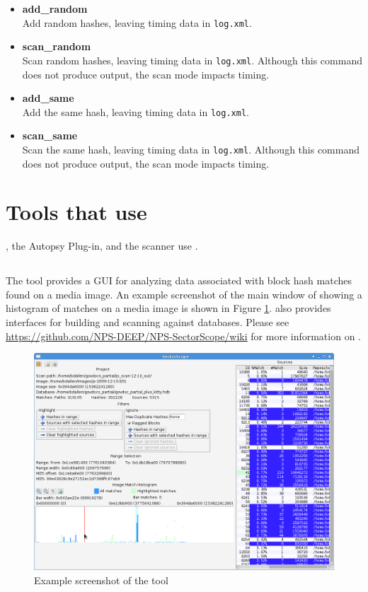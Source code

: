 \documentclass[11pt,fleqn]{article} %
\begin{document}
\begin{itemize}
\item \textbf{add\_random}\\
Add random hashes, leaving timing data in \verb+log.xml+.
\item \textbf{scan\_random}\\
Scan random hashes, leaving timing data in \verb+log.xml+. Although this command does not produce output, the scan mode impacts timing.
\item \textbf{add\_same}\\
Add the same hash, leaving timing data in \verb+log.xml+.
\item \textbf{scan\_same}\\
Scan the same hash, leaving timing data in \verb+log.xml+. Although this command does not produce output, the scan mode impacts timing.
\end{itemize}

\section{Tools that use \hdb}
\label{OtherTools}
\sscope, the \sscope Autopsy Plug-in, and the \bulk \hdb scanner use \hdb.

\subsection{\sscope}
The \sscope tool provides a GUI for analyzing data associated with block hash matches found on a media image. An example screenshot of the main window of \sscope showing a histogram of matches on a media image is shown in Figure \ref{fig:SectorScope_main}. \sscope also provides interfaces for building and scanning against \hdb databases. Please see \url{https://github.com/NPS-DEEP/NPS-SectorScope/wiki} for more information on \sscope.

\begin{figure}
	\center
	\includegraphics[scale=.45]{drawings/SectorScope_main}
	\caption{Example screenshot of the \sscope tool}
	\label{fig:SectorScope_main}
\end{figure}
\end{document}
